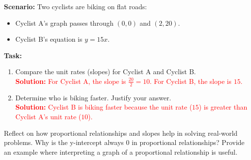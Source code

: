 \documentclass[12pt]{article}
\begin{document}
\vspace{1em}

\begin{tcolorbox}[colframe=black!60, colback=white, 
coltitle=black, colbacktitle=black!15, fonttitle=\bfseries\Large, 
title=Performance Task: Comparing Travel Speeds, halign title=center, left=10pt, right=10pt, top=10pt, bottom=50pt]
\textbf{Scenario:} Two cyclists are biking on flat roads:
\begin{itemize}
    \item Cyclist A's graph passes through \((0, 0)\) and \((2, 20)\).
    \item Cyclist B's equation is \(y = 15x\).
\end{itemize}
\textbf{Task:}
\begin{enumerate}[itemsep=3em]
    \item Compare the unit rates (slopes) for Cyclist A and Cyclist B.\\
    \textcolor{red}{\textbf{Solution:} For Cyclist A, the slope is \(\frac{20}{2} = 10\). For Cyclist B, the slope is \(15\).}

    \item Determine who is biking faster. Justify your answer.\\
    \textcolor{red}{\textbf{Solution:} Cyclist B is biking faster because the unit rate (\(15\)) is greater than Cyclist A's unit rate (\(10\)).}
\end{enumerate}
\end{tcolorbox}

\vspace{1em}

\begin{tcolorbox}[colframe=black!60, colback=white, 
coltitle=black, colbacktitle=black!15, fonttitle=\bfseries\Large, 
title=Reflection, halign title=center, left=10pt, right=10pt, top=10pt, bottom=80pt]
Reflect on how proportional relationships and slopes help in solving real-world problems. Why is the y-intercept always \(0\) in proportional relationships? Provide an example where interpreting a graph of a proportional relationship is useful.
\end{tcolorbox}
\end{document}

